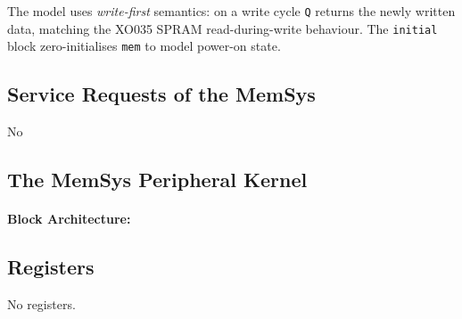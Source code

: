 The model uses \emph{write-first} semantics: on a write cycle
\texttt{Q} returns the newly written data, matching the XO035 SPRAM
read-during-write behaviour.
The \texttt{initial} block zero-initialises \texttt{mem} to
model power-on state.






\subsection{Service Requests of the MemSys}
No


\subsection{The MemSys Peripheral Kernel}
\label{subsec:memsysfunc02}
\paragraph{Block Architecture: } 



\subsection{Registers}
No registers.

